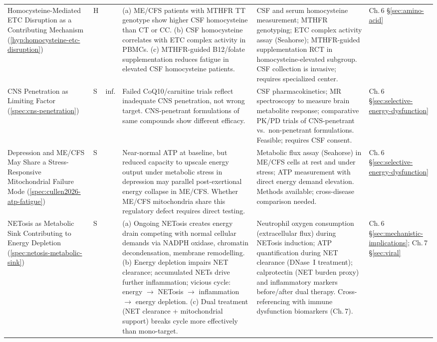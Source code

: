 \begin{longtable}{%
  p{3.0cm}
  >{\centering\arraybackslash}p{0.55cm}
  >{\centering\arraybackslash}p{1.0cm}
  p{3.8cm}
  p{3.8cm}
  p{2.2cm}
}
Homocysteine-Mediated ETC Disruption as a Contributing Mechanism
(\ref{hyp:homocysteine-etc-disruption})
&
H & 0.30
&
(a) ME/CFS patients with MTHFR TT genotype show higher CSF homocysteine than CT or CC.
(b) CSF homocysteine correlates with ETC complex activity in PBMCs.
(c) MTHFR-guided B12/folate supplementation reduces fatigue in elevated CSF homocysteine patients.
&
CSF and serum homocysteine measurement; MTHFR genotyping; ETC complex activity assay (Seahorse);
MTHFR-guided supplementation RCT in homocysteine-elevated subgroup.
CSF collection is invasive; requires specialized center.
&
Ch.\,6 \S\ref{sec:amino-acid} \\[6pt]

CNS Penetration as Limiting Factor
(\ref{spec:cns-penetration})
&
S & inf.
&
Failed CoQ10/carnitine trials reflect inadequate CNS penetration, not wrong
target.
CNS-penetrant formulations of same compounds show different efficacy.
&
CSF pharmacokinetics; MR spectroscopy to measure brain metabolite response;
comparative PK/PD trials of CNS-penetrant vs.\ non-penetrant formulations.
Feasible; requires CSF consent.
&
Ch.\,6 \S\ref{sec:selective-energy-dysfunction} \\[6pt]

Depression and ME/CFS May Share a Stress-Responsive Mitochondrial Failure Mode
(\ref{spec:cullen2026-atp-fatigue})
&
S & 0.40
&
Near-normal ATP at baseline, but reduced capacity to upscale energy output
under metabolic stress in depression may parallel post-exertional energy
collapse in ME/CFS.
Whether ME/CFS mitochondria share this regulatory defect requires direct testing.
&
Metabolic flux assay (Seahorse) in ME/CFS cells at rest and under stress;
ATP measurement with direct energy demand elevation.
Methods available; cross-disease comparison needed.
&
Ch.\,6 \S\ref{sec:selective-energy-dysfunction} \\[6pt]

NETosis as Metabolic Sink Contributing to Energy Depletion
(\ref{spec:netosis-metabolic-sink})
&
S & 0.30
&
(a) Ongoing NETosis creates energy drain competing with normal cellular demands
via NADPH oxidase, chromatin decondensation, membrane remodelling.
(b) Energy depletion impairs NET clearance; accumulated NETs drive further
inflammation; vicious cycle: energy $\to$ NETosis $\to$ inflammation $\to$ energy depletion.
(c) Dual treatment (NET clearance + mitochondrial support) breaks cycle
more effectively than mono-target.
&
Neutrophil oxygen consumption (extracellular flux) during NETosis induction;
ATP quantification during NET clearance (DNase~I treatment);
calprotectin (NET burden proxy) and inflammatory markers before/after dual therapy.
Cross-referencing with immune dysfunction biomarkers (Ch.\,7).
&
Ch.\,6 \S\ref{sec:mechanistic-implications}; Ch.\,7 \S\ref{sec:viral} \\[6pt]


\end{longtable}
